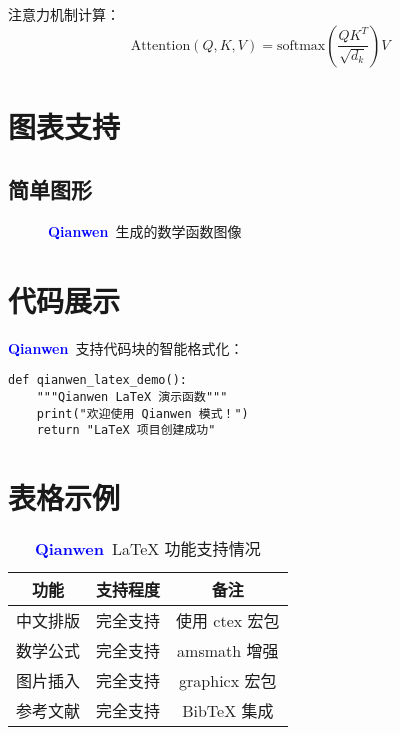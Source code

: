 \documentclass[11pt,a4paper]{article}
\newcommand{\qianwen}{\textcolor{blue}{\textbf{Qianwen}}}
\begin{document}
注意力机制计算：
\begin{equation}
    \text{Attention}(Q, K, V) = \text{softmax}\left(\frac{QK^T}{\sqrt{d_k}}\right)V
\end{equation}

\section{图表支持}

\subsection{简单图形}

\begin{figure}[h]
\centering
{}
\caption{\qianwen\ 生成的数学函数图像}
\label{fig:parabola}
\end{figure}

\section{代码展示}

\qianwen\ 支持代码块的智能格式化：

\begin{verbatim}
def qianwen_latex_demo():
    """Qianwen LaTeX 演示函数"""
    print("欢迎使用 Qianwen 模式！")
    return "LaTeX 项目创建成功"
\end{verbatim}

\section{表格示例}

\begin{table}[h]
\centering
\begin{tabular}{|c|c|c|}
\hline
\textbf{功能} & \textbf{支持程度} & \textbf{备注} \\
\hline
中文排版 & 完全支持 & 使用 ctex 宏包 \\
数学公式 & 完全支持 & amsmath 增强 \\
图片插入 & 完全支持 & graphicx 宏包 \\
参考文献 & 完全支持 & BibTeX 集成 \\
\hline
\end{tabular}
\caption{\qianwen\ LaTeX 功能支持情况}
\label{tab:features}
\end{table}
\end{document}

